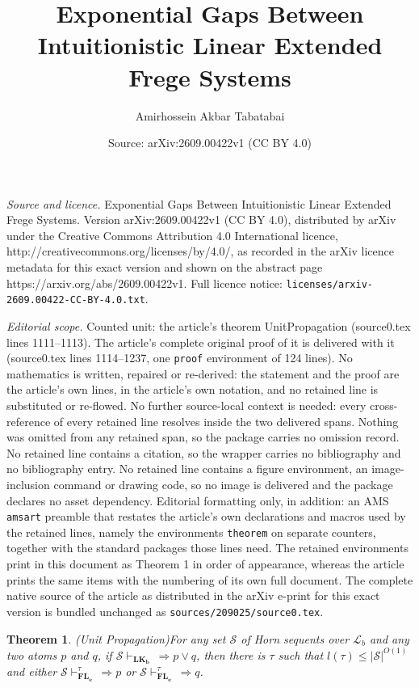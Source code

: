 \documentclass[10pt,a4paper]{amsart}
\title{Exponential Gaps Between Intuitionistic Linear Extended Frege Systems}
\author{Amirhossein Akbar Tabatabai}
\date{Source: arXiv:2609.00422v1 (CC BY 4.0)}
\newtheorem{theorem}{Theorem}
\newcommand{\LKb}{\mathbf{LK_b}}
\begin{document}
\maketitle

\noindent\emph{Source and licence.} Exponential Gaps Between Intuitionistic Linear Extended Frege Systems. Version arXiv:2609.00422v1 (CC BY 4.0), distributed by arXiv under the Creative Commons Attribution 4.0 International licence, http://creativecommons.org/licenses/by/4.0/, as recorded in the arXiv licence metadata for this exact version and shown on the abstract page https://arxiv.org/abs/2609.00422v1. Full licence notice: \texttt{licenses/arxiv-2609.00422-CC-BY-4.0.txt}.\par\smallskip

\noindent\textit{Editorial scope.} Counted unit: the article's theorem UnitPropagation (source0.tex lines 1111--1113). The article's complete original proof of it is delivered with it (source0.tex lines 1114--1237, one \texttt{proof} environment of 124 lines). No mathematics is written, repaired or re-derived: the statement and the proof are the article's own lines, in the article's own notation, and no retained line is substituted or re-flowed.  No further source-local context is needed: every cross-reference of every retained line resolves inside the two delivered spans.  Nothing was omitted from any retained span, so the package carries no omission record.  No retained line contains a citation, so the wrapper carries no bibliography and no bibliography entry.  No retained line contains a figure environment, an image-inclusion command or drawing code, so no image is delivered and the package declares no asset dependency.  Editorial formatting only, in addition: an AMS \texttt{amsart} preamble that restates the article's own declarations and macros used by the retained lines, namely the environments \texttt{theorem} on separate counters, together with the standard packages those lines need.  The retained environments print in this document as Theorem 1 in order of appearance, whereas the article prints the same items with the numbering of its own full document.  The complete native source of the article as distributed in the arXiv e-print for this exact version is bundled unchanged as \texttt{sources/209025/source0.tex}.
\begin{theorem}(Unit Propagation)\label{UnitPropagation}
For any set $\mathcal{S}$ of Horn sequents over $\mathcal{L}_b$ and any two atoms $p$ and $q$, if $\mathcal{S} \vdash_{\LKb} \, \Rightarrow p \vee q$, then there is $\tau$ such that $l(\tau) \leq |\mathcal{S}|^{O(1)}$ and either $\mathcal{S} \vdash_{\mathbf{FL_e}}^{\tau} \, \Rightarrow p$ or $\mathcal{S} \vdash_{\mathbf{FL_e}}^{\tau} \, \Rightarrow q$. 
\end{theorem}
\end{document}
